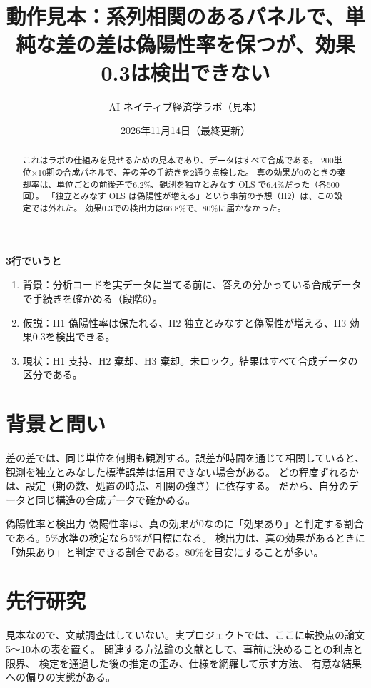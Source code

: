 \documentclass[a4paper,10pt]{ltjsarticle}
\title{動作見本：系列相関のあるパネルで、単純な差の差は偽陽性率を保つが、効果0.3は検出できない}
\author{AI ネイティブ経済学ラボ（見本）}
\date{2026年11月14日（最終更新）}
\begin{document}
\maketitle

\begin{abstract}
これはラボの仕組みを見せるための見本であり、データはすべて合成である。
200単位×10期の合成パネルで、差の差の手続きを2通り点検した。
真の効果が0のときの棄却率は、単位ごとの前後差で6.2\%、観測を独立とみなす OLS で6.4\%だった（各500回）。
「独立とみなす OLS は偽陽性が増える」という事前の予想（H2）は、この設定では外れた。
効果0.3での検出力は66.8\%で、80\%に届かなかった。
\end{abstract}

\begin{chaptermap}
\textbf{3行でいうと}
\begin{enumerate}[leftmargin=*]
  \item 背景：分析コードを実データに当てる前に、答えの分かっている合成データで手続きを確かめる（段階6）。
  \item 仮説：H1 偽陽性率は保たれる、H2 独立とみなすと偽陽性が増える、H3 効果0.3を検出できる。
  \item 現状：H1 支持、H2 棄却、H3 棄却。未ロック。結果はすべて合成データの区分である。
\end{enumerate}
\end{chaptermap}

\section{背景と問い}\label{sec:demo-bg}
差の差では、同じ単位を何期も観測する。誤差が時間を通じて相関していると、観測を独立とみなした標準誤差は信用できない場合がある。
どの程度ずれるかは、設定（期の数、処置の時点、相関の強さ）に依存する。
だから、自分のデータと同じ構造の合成データで確かめる。

\begin{term}{偽陽性率と検出力}
偽陽性率は、真の効果が0なのに「効果あり」と判定する割合である。5\%水準の検定なら5\%が目標になる。
検出力は、真の効果があるときに「効果あり」と判定できる割合である。80\%を目安にすることが多い。
\end{term}

\section{先行研究}\label{sec:demo-prior}
見本なので、文献調査はしていない。実プロジェクトでは、ここに転換点の論文5〜10本の表を置く。
関連する方法論の文献として、事前に決めることの利点と限界\parencite{olken2015}、
検定を通過した後の推定の歪み\parencite{roth2022}、仕様を網羅して示す方法\parencite{simonsohn2020}、
有意な結果への偏りの実態\parencite{brodeur2020}がある。
\end{document}
